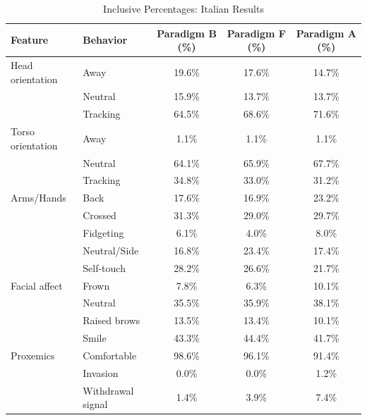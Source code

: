 \begin{table}[ht]
\centering
\caption{Inclusive Percentages: Italian Results}
\label{tab:inclusive_pct_italian}
\begin{tabular}{llccc}
\toprule
Feature & Behavior & Paradigm B (\%) & Paradigm F (\%) & Paradigm A (\%) \\
\midrule
Head orientation & Away & 19.6\% & 17.6\% & 14.7\% \\
~ & Neutral & 15.9\% & 13.7\% & 13.7\% \\
~ & Tracking & 64.5\% & 68.6\% & 71.6\% \\
\midrule
Torso orientation & Away & 1.1\% & 1.1\% & 1.1\% \\
~ & Neutral & 64.1\% & 65.9\% & 67.7\% \\
~ & Tracking & 34.8\% & 33.0\% & 31.2\% \\
\midrule
Arms/Hands & Back & 17.6\% & 16.9\% & 23.2\% \\
~ & Crossed & 31.3\% & 29.0\% & 29.7\% \\
~ & Fidgeting & 6.1\% & 4.0\% & 8.0\% \\
~ & Neutral/Side & 16.8\% & 23.4\% & 17.4\% \\
~ & Self-touch & 28.2\% & 26.6\% & 21.7\% \\
\midrule
Facial affect & Frown & 7.8\% & 6.3\% & 10.1\% \\
~ & Neutral & 35.5\% & 35.9\% & 38.1\% \\
~ & Raised brows & 13.5\% & 13.4\% & 10.1\% \\
~ & Smile & 43.3\% & 44.4\% & 41.7\% \\
\midrule
Proxemics & Comfortable & 98.6\% & 96.1\% & 91.4\% \\
~ & Invasion & 0.0\% & 0.0\% & 1.2\% \\
~ & Withdrawal signal & 1.4\% & 3.9\% & 7.4\% \\
\bottomrule
\end{tabular}
\end{table}